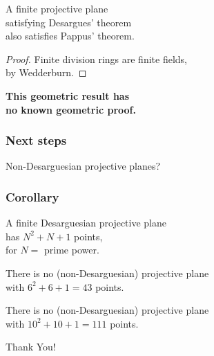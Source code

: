 \documentclass[14pt]{chalkfjord}
\begin{document}
\begin{frame}
  \begin{theorem}
    A finite projective plane \\
    \quad satisfying Desargues' theorem \\
    \quad also satisfies Pappus' theorem.
  \end{theorem}
  \pause
  \begin{proof}
    Finite division rings are finite fields,\\
    \quad by Wedderburn.
  \end{proof}
  \pause
  \vfill
  \textbf{This geometric result has\\
    \quad no known geometric proof.}

\end{frame}

\begin{frame}
  \frametitle{Next steps}

  \vfill

  \begin{center}
    Non-Desarguesian projective planes?
  \end{center}
  
  \vfill
\end{frame}

\begin{frame}
  \frametitle{Corollary}

  A finite Desarguesian projective plane \\
  \quad has $N^2 + N + 1$ points,\\
  \quad for $N = $ prime power.

  \vfill\pause

  \begin{theorem}
    There is no (non-Desarguesian) projective plane \\
    \quad with $6^2 + 6 + 1 = 43$ points.
  \end{theorem}

  \vfill\pause

  \begin{theorem}[Computer]
    There is no (non-Desarguesian) projective plane \\
    \quad with $10^2 + 10 + 1 = 111$ points.
  \end{theorem}

\end{frame}


\begin{frame}
  \Huge
  \vfill
  \begin{center}
    Thank You!
  \end{center}
  \vfill
\end{frame}
\end{document}
